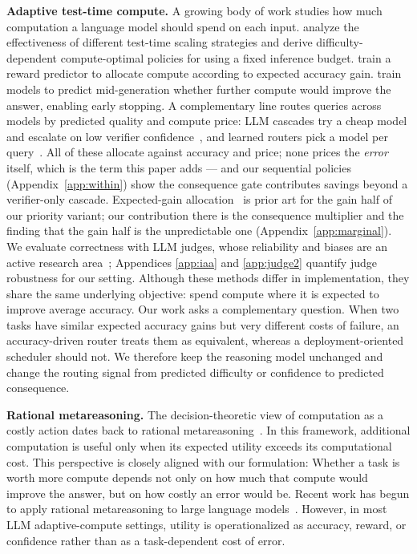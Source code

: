 \documentclass{article}
\begin{document}
\textbf{Adaptive test-time compute.}
A growing body of work studies how much computation a language model
should spend on each input. \citet{snell2024scaling} analyze the effectiveness of different test-time scaling strategies and derive difficulty-dependent compute-optimal policies for using a fixed inference budget. \citet{damani2024learning}
train a reward predictor to allocate compute according to expected
accuracy gain. \citet{manvi2024adaptive} train models to predict mid-generation
whether further compute would improve the answer, enabling early
stopping. A complementary line routes queries across models by
predicted quality and compute price: LLM cascades try a cheap model
and escalate on low verifier confidence~\citep{chen2023frugalgpt,
aggarwal2024automix}, and learned routers pick a model per
query~\citep{ong2024routellm, ding2024hybrid}. All of these
allocate against accuracy and price; none prices the \emph{error}
itself, which is the term this paper adds --- and our sequential
policies (Appendix~\ref{app:within}) show the consequence gate
contributes savings beyond a verifier-only cascade. Expected-gain
allocation~\citep{damani2024learning} is prior art for the
gain half of our priority variant; our contribution there is the
consequence multiplier and the finding that the gain half is the
unpredictable one (Appendix~\ref{app:marginal}). We evaluate
correctness with LLM judges, whose reliability and biases are an
active research area~\citep{zheng2023judging}; Appendices
\ref{app:iaa} and \ref{app:judge2} quantify judge robustness for
our setting. Although
these methods differ in implementation, they share the same underlying
objective: spend compute where it is expected to improve average
accuracy. Our work asks a complementary question. When two tasks have
similar expected accuracy gains but very different costs of failure,
an accuracy-driven router treats them as equivalent, whereas a
deployment-oriented scheduler should not. We therefore keep the
reasoning model unchanged and change the routing signal from predicted
difficulty or confidence to predicted consequence.

\textbf{Rational metareasoning.}
The decision-theoretic view of computation as a costly action dates
back to rational metareasoning~\citep{russell1991right,
hay2012selecting}. In this framework, additional computation is useful
only when its expected utility exceeds its computational cost.
This perspective is closely aligned with our formulation: Whether a task is worth more compute depends not only on how much that compute would improve the answer, but on how costly an error would be. Recent work
has begun to apply rational metareasoning to large language
models~\citep{yang2024rational}. However, in most LLM adaptive-compute
settings, utility is operationalized as accuracy, reward, or confidence
rather than as a task-dependent cost of error.
\end{document}
